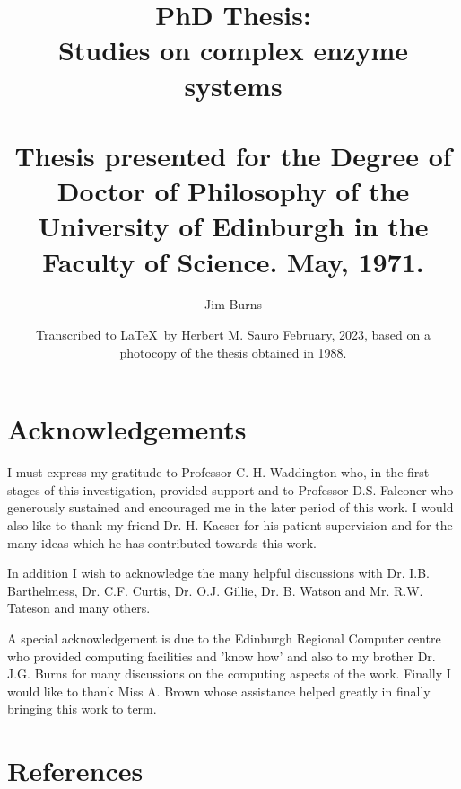 \documentclass[11pt]{book}
\title{PhD Thesis:\\
 Studies on complex enzyme systems\\ \phantom{a}\\

{\Large Thesis presented for the Degree of Doctor of Philosophy of
the University of Edinburgh in the Faculty of Science.
May, 1971.}}
\author{Jim Burns}
\date{\large Transcribed to \LaTeX\ by Herbert M. Sauro February, 2023, based on a photocopy of the thesis obtained in 1988.}
\begin{document}
\maketitle

\tableofcontents









\chapter*{Acknowledgements}
\thispagestyle{empty}

I must express my gratitude to Professor C. H. Waddington who, in the first stages of this investigation, provided support and to Professor D.S. Falconer who generously sustained and encouraged me in the later period of this work. I would also like to thank my friend Dr. H. Kacser for his patient supervision and for the many ideas which he has contributed towards this work.

In addition I wish to acknowledge the many helpful discussions with Dr. I.B. Barthelmess, Dr. C.F. Curtis, Dr. O.J. Gillie, Dr. B. Watson and Mr. R.W. Tateson and many others.

A special acknowledgement is due to the Edinburgh Regional Computer centre who provided computing facilities and 'know how' and also to my brother Dr. J.G. Burns for many discussions on the computing aspects of the work. Finally I would like to thank Miss A. Brown whose assistance helped greatly in finally bringing this work to term.


\clearpage

\chapter*{References}
\thispagestyle{empty}
\end{document}
